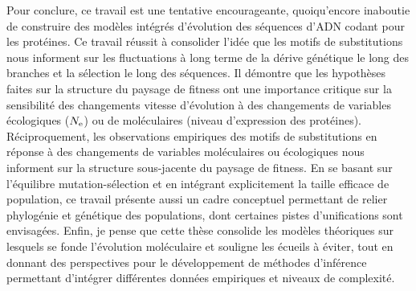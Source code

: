 \newpage
Pour conclure, ce travail est une tentative encourageante, quoiqu'encore inaboutie de construire des modèles intégrés d'évolution des séquences d'ADN codant pour les protéines.
Ce travail réussit à consolider l'idée que les motifs de substitutions nous informent sur les fluctuations à long terme de la dérive génétique le long des branches et la sélection le long des séquences.
Il démontre que les hypothèses faites sur la structure du paysage de fitness ont une importance critique sur la sensibilité des changements vitesse d'évolution à des changements de variables écologiques ($N_{\text{e}}$) ou de moléculaires (niveau d'expression des protéines).
Réciproquement, les observations empiriques des motifs de substitutions en réponse à des changements de variables moléculaires ou écologiques nous informent sur la structure sous-jacente du paysage de fitness.
En se basant sur l'équilibre mutation-sélection et en intégrant explicitement la taille efficace de population, ce travail présente aussi un cadre conceptuel permettant de relier phylogénie et génétique des populations, dont certaines pistes d'unifications sont envisagées.
Enfin, je pense que cette thèse consolide les modèles théoriques sur lesquels se fonde l'évolution moléculaire et souligne les écueils à éviter, tout en donnant des perspectives pour le développement de méthodes d'inférence permettant d'intégrer différentes données empiriques et niveaux de complexité.